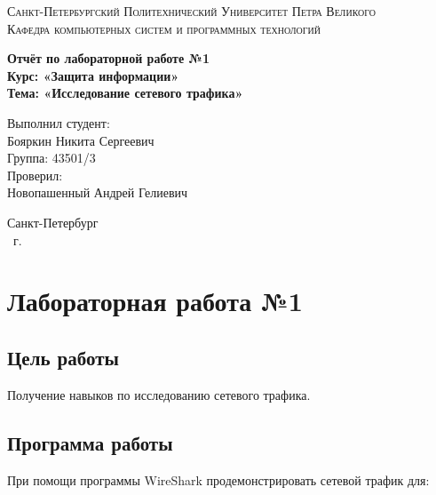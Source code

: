 \documentclass[14pt,a4paper,report]{report}
\begin{document}
\def\contentsname{Содержание}

\begin{titlepage}
	\begin{center}
		\textsc{Санкт-Петербургский Политехнический 
			Университет Петра Великого\\[5mm]
			Кафедра компьютерных систем и программных технологий}
		
		\vfill
		
		\textbf{Отчёт по лабораторной работе №1\\[3mm]
			Курс: «Защита информации»\\[6mm]
			Тема: «Исследование сетевого трафика»\\[35mm]
		}
	\end{center}
	
	\hfill
	\begin{minipage}{.5\textwidth}
		Выполнил студент:\\[2mm] 
		Бояркин Никита Сергеевич\\
		Группа: 43501/3\\[5mm]
		
		Проверил:\\[2mm] 
		Новопашенный Андрей Гелиевич
	\end{minipage}
	\vfill
	\begin{center}
		Санкт-Петербург\\ \the\year\ г.
	\end{center}
\end{titlepage}

\tableofcontents
\clearpage

\chapter{Лабораторная работа №1}

\section{Цель работы}

Получение навыков по исследованию сетевого трафика.

\section{Программа работы}

При помощи программы WireShark продемонстрировать сетевой трафик для:
\end{document}
